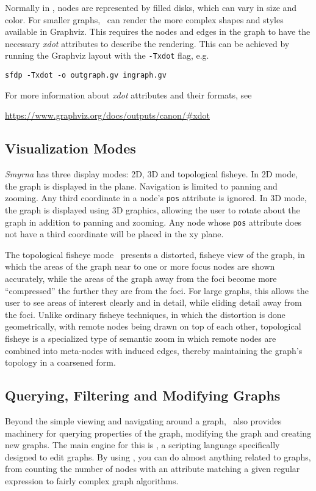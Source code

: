 Normally in \smyrna, nodes are represented by filled disks, which
can vary in size and color. For smaller graphs, \smyrna\ 
can render the more complex shapes and styles available in Graphviz.
This requires the nodes and edges in the graph to have the necessary
{\it xdot} attributes to describe the rendering. This can be achieved
by running the Graphviz layout with the {\tt -Txdot} flag, e.g.
\begin{center}
{\tt sfdp -Txdot -o outgraph.gv ingraph.gv}
\end{center}
For more information about {\it xdot} attributes and their formats,
see
\begin{center}
\url{https://www.graphviz.org/docs/outputs/canon/#xdot}
\end{center}

\subsection{Visualization Modes} 
\label{sec:vizmodes}
{\it Smyrna} has three display modes:
2D, 3D and topological fisheye. 
In 2D mode, the graph is displayed in the plane. Navigation is
limited to panning and zooming. Any third coordinate in a
node's {\tt pos} attribute is ignored.
In 3D mode, the graph is displayed using 3D graphics, allowing the
user to rotate about the graph in addition to panning and zooming.
Any node whose {\tt pos} attribute does not have a third coordinate
will be placed in the xy plane.

The topological fisheye mode~\cite{topfish} presents a 
distorted, fisheye view of the
graph, in which the areas of the graph near to one or more focus nodes
are shown accurately, while the areas of the graph away from the foci
become more ``compressed'' the further they are from the foci.
For large graphs, this allows the user to see areas of interest clearly
and in detail, while eliding detail away from the foci.
Unlike ordinary fisheye techniques, in which
the distortion is done geometrically, with remote nodes being
drawn on top of each other, 
topological fisheye is a specialized type of semantic zoom in which
remote nodes are combined into meta-nodes with induced edges, thereby
maintaining the graph's topology in a coarsened form.

\subsection{Querying, Filtering and Modifying Graphs}   
Beyond the simple viewing and navigating around a graph, \smyrna\
also provides machinery for querying properties of the graph, modifying
the graph and creating new graphs. The main engine for this is \gvpr,
a scripting language specifically designed to edit graphs. By using 
\gvpr, you can do almost anything related to graphs, from counting 
the number of nodes with an attribute matching a given regular expression to
fairly complex graph algorithms.

